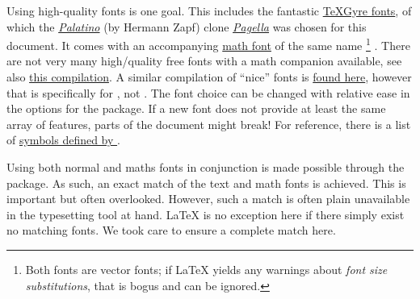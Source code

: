 Using high-quality fonts is one goal.
This includes the fantastic
\href{https://ctan.org/texarchive/fonts/tex-gyre/opentype}{\TeX Gyre fonts},
of which the \emph{\href{https://en.wikipedia.org/wiki/Palatino}{Palatino}}
(by Hermann Zapf) clone \emph{\href{https://ctan.org/pkg/tex-gyre-pagella}{Pagella}}
was chosen for this document.
It comes with an accompanying
\href{https://ctan.org/texarchive/fonts/tex-gyre-math/opentype}{math font}
of the same name%
\footnote{
    Both fonts are vector fonts;
    if \LaTeX{} yields any warnings about \emph{font size substitutions},
    that is bogus and can be ignored.
}%
.
There are not very many high\-/quality free fonts with a math companion available,
see also \href{https://tex.stackexchange.com/a/425099/120853}{this compilation}.
A similar compilation of \enquote{nice} fonts is
\href{https://tex.stackexchange.com/a/59706/120853}{found here},
however that is specifically for , not .
The font choice can be changed with relative ease in the options for the
 package.
If a new font does not provide at least the same array of features,
parts of the document might break!
For reference, there is a list of
\href{http://mirrors.ctan.org/macros/unicodetex/latex/unicode-math/unimath-symbols.pdf}{symbols defined by }.

Using both normal and maths fonts in conjunction is made possible through the
 package.
As such, an exact match of the text and math fonts is achieved.
This is important but often overlooked.
However, such a match is often plain unavailable in the typesetting tool at hand.
\LaTeX{} is no exception here if there simply exist no matching fonts.
We took care to ensure a complete match here.

